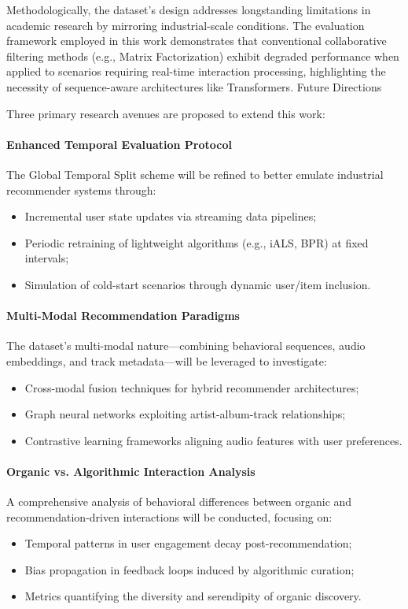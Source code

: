 \documentclass[sigconf,authorversion,nonacm]{acmart}
\begin{document}
Methodologically, the dataset’s design addresses longstanding limitations in academic research by mirroring industrial-scale conditions. The evaluation framework employed in this work demonstrates that conventional collaborative filtering methods (e.g., Matrix Factorization) exhibit degraded performance when applied to scenarios requiring real-time interaction processing, highlighting the necessity of sequence-aware architectures like Transformers.
Future Directions

Three primary research avenues are proposed to extend this work:

\paragraph{Enhanced Temporal Evaluation Protocol}
The Global Temporal Split scheme will be refined to better emulate industrial recommender systems through:
\begin{itemize}
    \item Incremental user state updates via streaming data pipelines;
    \item Periodic retraining of lightweight algorithms (e.g., iALS, BPR) at fixed intervals;
    \item Simulation of cold-start scenarios through dynamic user/item inclusion.
\end{itemize}

\paragraph{Multi-Modal Recommendation Paradigms}
The dataset’s multi-modal nature—combining behavioral sequences, audio embeddings, and track metadata—will be leveraged to investigate:
\begin{itemize}
    \item Cross-modal fusion techniques for hybrid recommender architectures;
    \item Graph neural networks exploiting artist-album-track relationships;
    \item Contrastive learning frameworks aligning audio features with user preferences.
\end{itemize}

\paragraph{Organic vs. Algorithmic Interaction Analysis}
A comprehensive analysis of behavioral differences between organic and recommendation-driven interactions will be conducted, focusing on:
\begin{itemize}
    \item Temporal patterns in user engagement decay post-recommendation;
    \item Bias propagation in feedback loops induced by algorithmic curation;
    \item Metrics quantifying the diversity and serendipity of organic discovery.
\end{itemize}
\end{document}
